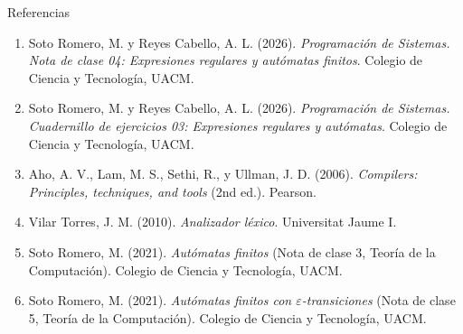 \documentclass[11pt,spanish]{beamer}
\begin{document}
\begin{frame}{Referencias}
\vfill

\tiny
\begin{enumerate}
\item Soto Romero, M. y Reyes Cabello, A. L. (2026). \textit{Programación de Sistemas. Nota de clase 04: Expresiones regulares y autómatas finitos}. Colegio de Ciencia y Tecnología, UACM.
\item Soto Romero, M. y Reyes Cabello, A. L. (2026). \textit{Programación de Sistemas. Cuadernillo de ejercicios 03: Expresiones regulares y autómatas}. Colegio de Ciencia y Tecnología, UACM.
\item Aho, A. V., Lam, M. S., Sethi, R., y Ullman, J. D. (2006). \textit{Compilers: Principles, techniques, and tools} (2nd ed.). Pearson.
\item Vilar Torres, J. M. (2010). \textit{Analizador léxico}. Universitat Jaume I.
\item Soto Romero, M. (2021). \textit{Autómatas finitos} (Nota de clase 3, Teoría de la Computación). Colegio de Ciencia y Tecnología, UACM.
\item Soto Romero, M. (2021). \textit{Autómatas finitos con \(\varepsilon\)-transiciones} (Nota de clase 5, Teoría de la Computación). Colegio de Ciencia y Tecnología, UACM.
\end{enumerate}

\vfill
\end{frame}
\end{document}
